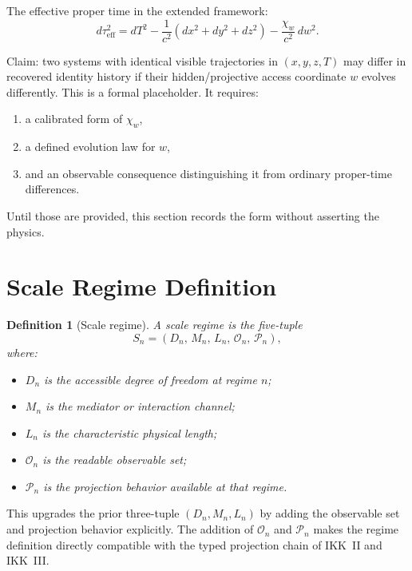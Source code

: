 \documentclass[11pt,a4paper,oneside]{article}
\newtheorem{definition}{Definition}[section]
\newcommand{\wcoord}{w}
\newcommand{\chiw}{\chi_w}                     %
\begin{document}
The effective proper time in the extended framework:
\[
d\tau_{\mathrm{eff}}^2 = dT^2 - \frac{1}{c^2}\!\left(dx^2 + dy^2 + dz^2\right) - \frac{\chiw}{c^2}\, d\wcoord^2.
\]

Claim: two systems with identical visible trajectories in $(x,y,z,T)$ may differ in recovered identity history if their hidden/projective access coordinate $\wcoord$ evolves differently. This is a formal placeholder. It requires:
\begin{enumerate}
\item a calibrated form of $\chiw$,
\item a defined evolution law for $\wcoord$,
\item and an observable consequence distinguishing it from ordinary proper-time differences.
\end{enumerate}

Until those are provided, this section records the form without asserting the physics.

\section{Scale Regime Definition}
\label{def:regime}

\begin{definition}[Scale regime]
A scale regime is the five-tuple
\[
S_n = (D_n,\, M_n,\, L_n,\, \mathcal{O}_n,\, \mathcal{P}_n),
\]
where:
\begin{itemize}
\item $D_n$ is the accessible degree of freedom at regime $n$;
\item $M_n$ is the mediator or interaction channel;
\item $L_n$ is the characteristic physical length;
\item $\mathcal{O}_n$ is the readable observable set;
\item $\mathcal{P}_n$ is the projection behavior available at that regime.
\end{itemize}
\end{definition}

This upgrades the prior three-tuple $(D_n, M_n, L_n)$ by adding the observable set and projection behavior explicitly. The addition of $\mathcal{O}_n$ and $\mathcal{P}_n$ makes the regime definition directly compatible with the typed projection chain of IKK~II and IKK~III.
\end{document}
